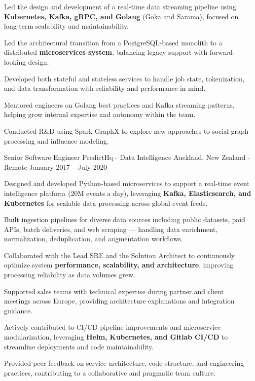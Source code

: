 \begin{cventries}
{\begin{cvitems}
      \item {Led the design and development of a real-time data streaming pipeline using \textbf{Kubernetes, Kafka, gRPC, and Golang} (Goka and Sarama), focused on long-term scalability and maintainability.}
      \item {Led the architectural transition from a PostgreSQL-based monolith to a distributed \textbf{microservices system}, balancing legacy support with forward-looking design.}
      \item {Developed both stateful and stateless services to handle job state, tokenization, and data transformation with reliability and performance in mind.}
      \item {Mentored engineers on Golang best practices and Kafka streaming patterns, helping grow internal expertise and autonomy within the team.}
      \item {Conducted R\&D using Spark GraphX to explore new approaches to social graph processing and influence modeling.}
    \end{cvitems}
  }

  \cventry
    {Senior Software Engineer} %
    {PredictHq - Data Intelligence} %
    {Auckland, New Zealand - Remote} %
    {January 2017 – July 2020} %
    {
      \begin{cvitems} %
        \item {Designed and developed Python-based microservices to support a real-time event intelligence platform (20M events a day), leveraging \textbf{Kafka, Elasticsearch, and Kubernetes} for scalable data processing across global event feeds.}
        \item {Built ingestion pipelines for diverse data sources including public datasets, paid APIs, batch deliveries, and web scraping — handling data enrichment, normalization, deduplication, and augmentation workflows.}
        \item {Collaborated with the Lead SRE and the Solution Architect to continuously optimize system \textbf{performance, scalability, and architecture}, improving processing reliability as data volumes grew.}
        \item {Supported sales teams with technical expertise during partner and client meetings across Europe, providing architecture explanations and integration guidance.}
        \item {Actively contributed to CI/CD pipeline improvements and microservice modularization, leveraging \textbf{Helm, Kubernetes, and Gitlab CI/CD} to streamline deployments and code maintainability.}
        \item {Provided peer feedback on service architecture, code structure, and engineering practices, contributing to a collaborative and pragmatic team culture.}
      \end{cvitems}
    }


\end{cventries}
